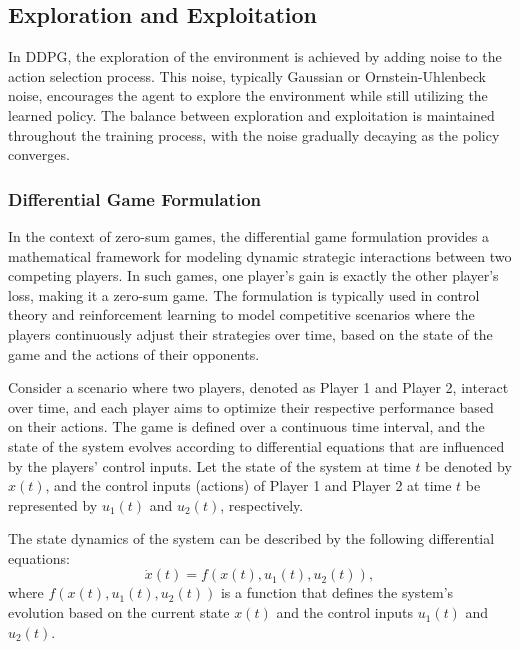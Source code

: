 \documentclass[conference]{IEEEtran}
\begin{document}
\subsection{Exploration and Exploitation}
In DDPG, the exploration of the environment is achieved by adding noise to the action selection process. This noise, typically Gaussian or Ornstein-Uhlenbeck noise, encourages the agent to explore the environment while still utilizing the learned policy. The balance between exploration and exploitation is maintained throughout the training process, with the noise gradually decaying as the policy converges.




\subsubsection{Differential Game Formulation}
In the context of zero-sum games, the differential game formulation provides a mathematical framework for modeling dynamic strategic interactions between two competing players. In such games, one player's gain is exactly the other player's loss, making it a zero-sum game. The formulation is typically used in control theory and reinforcement learning to model competitive scenarios where the players continuously adjust their strategies over time, based on the state of the game and the actions of their opponents.

Consider a scenario where two players, denoted as Player 1 and Player 2, interact over time, and each player aims to optimize their respective performance based on their actions. The game is defined over a continuous time interval, and the state of the system evolves according to differential equations that are influenced by the players' control inputs. Let the state of the system at time \( t \) be denoted by \( x(t) \), and the control inputs (actions) of Player 1 and Player 2 at time \( t \) be represented by \( u_1(t) \) and \( u_2(t) \), respectively.

The state dynamics of the system can be described by the following differential equations:
\begin{equation}
    \dot{x}(t) = f(x(t), u_1(t), u_2(t)),
\end{equation}
where \( f(x(t), u_1(t), u_2(t)) \) is a function that defines the system's evolution based on the current state \( x(t) \) and the control inputs \( u_1(t) \) and \( u_2(t) \).
\end{document}
